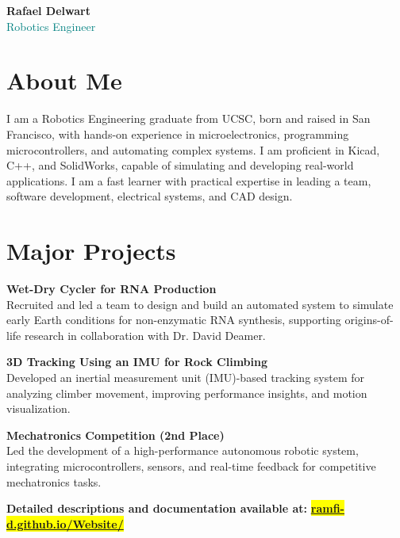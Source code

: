 \documentclass[a4paper,9pt]{article}
\begin{document}
\begin{center}
    {\Large \textbf{Rafael Delwart}} \\
    {\small \textcolor{teal}{Robotics Engineer}} \\
    \vspace{0.3em}
\end{center}

\section*{About Me}
 I am a Robotics Engineering graduate from UCSC, born and raised in San Francisco, with hands-on experience in microelectronics, programming microcontrollers, and automating complex systems. I am proficient in Kicad, C++, and SolidWorks, capable of simulating and developing real-world applications. I am a fast learner with practical expertise in leading a team, software development, electrical systems, and CAD design.\normalsize

\section*{Major Projects}

\small 

\textbf{Wet-Dry Cycler for RNA Production} \\
Recruited and led a team to design and build an automated system to simulate early Earth conditions for non-enzymatic RNA synthesis, supporting origins-of-life research in collaboration with Dr. David Deamer.

\textbf{3D Tracking Using an IMU for Rock Climbing} \\
Developed an inertial measurement unit (IMU)-based tracking system for analyzing climber movement, improving performance insights, and motion visualization.

\textbf{Mechatronics Competition (2nd Place)} \\
Led the development of a high-performance autonomous robotic system, integrating microcontrollers, sensors, and real-time feedback for competitive mechatronics tasks.

\textbf{Detailed descriptions and documentation available at: }\colorbox{yellow}{\href{https://ramfi-d.github.io/Website/}{\textbf{ramfi-d.github.io/Website/}}}
\end{document}
